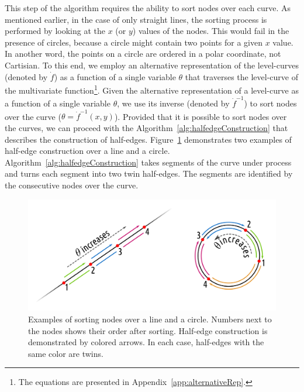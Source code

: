 This step of the algorithm requires the ability to sort nodes over each curve.
As mentioned earlier, in the case of only straight lines, the sorting process is performed by looking at the $x$ (or $y$) values of the nodes.
This would fail in the presence of circles, because a circle might contain two points for a given $x$ value.
In another word, the points on a circle are ordered in a polar coordinate, not Cartisian.
To this end, we employ an alternative representation of the level-curves (denoted by $\dot{f}$) as a function of a single variable $\theta$ that traverses the level-curve of the multivariate function\footnote{The equations are presented in Appendix~\ref{app:alternativeRep}.}.
Given the alternative representation of a level-curve as a function of a single variable $\theta$, we use its inverse (denoted by $\dot{f}^{-1}$) to sort nodes over the curve ($\theta = \dot{f}^{-1}(x,y)$).
Provided that it is possible to sort nodes over the curves, we can proceed with the Algorithm~\ref{alg:halfedgeConstruction} that describes the construction of half-edges.
Figure~\ref{fig:subd_heConstruct} demonstrates two examples of half-edge construction over a line and a circle.
Algorithm~\ref{alg:halfedgeConstruction} takes segments of the curve under process and turns each segment into two twin half-edges.
The segments are identified by the consecutive nodes over the curve.

\begin{figure}
    \centering
    \includegraphics[width=.8\textwidth]{figures/subd_heConstruct.png}
    \caption{Examples of sorting nodes over a line and a circle.
      Numbers next to the nodes shows their order after sorting.
      Half-edge construction is demonstrated by colored arrows.
      In each case, half-edges with the same color are twins.}
    \label{fig:subd_heConstruct}
\end{figure}

